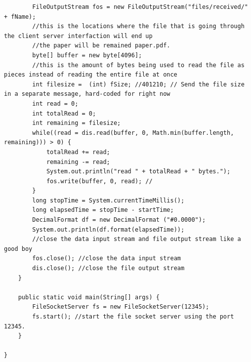 \documentclass{article}
\begin{document}
\begin{lstlisting}
        FileOutputStream fos = new FileOutputStream("files/received/" + fName); 
        //this is the locations where the file that is going through the client server interfaction will end up
        //the paper will be remained paper.pdf.
        byte[] buffer = new byte[4096];
        //this is the amount of bytes being used to read the file as pieces instead of reading the entire file at once
        int filesize =  (int) fSize; //401210; // Send the file size in a separate message, hard-coded for right now
        int read = 0;
        int totalRead = 0;
        int remaining = filesize;
        while((read = dis.read(buffer, 0, Math.min(buffer.length, remaining))) > 0) {
            totalRead += read;
            remaining -= read;
            System.out.println("read " + totalRead + " bytes.");
            fos.write(buffer, 0, read); //
        }
        long stopTime = System.currentTimeMillis();
        long elapsedTime = stopTime - startTime;
        DecimalFormat df = new DecimalFormat ("#0.0000");
        System.out.println(df.format(elapsedTime));
        //close the data input stream and file output stream like a good boy
        fos.close(); //close the data input stream
        dis.close(); //close the file output stream
    }

    public static void main(String[] args) {
        FileSocketServer fs = new FileSocketServer(12345);
        fs.start(); //start the file socket server using the port 12345.
    }

}

\end{lstlisting}
\end{document}
